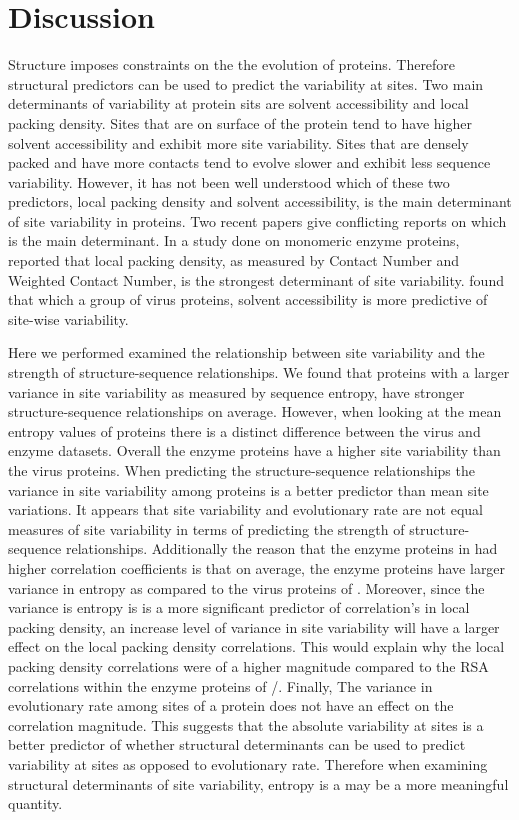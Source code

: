 \documentclass[12pt]{article}
\begin{document}
\section{Discussion}
\label{sec:dcr}
Structure imposes constraints on the the evolution of proteins. Therefore structural predictors can be used to predict the variability at sites. Two main determinants of variability at protein sits are solvent accessibility and local packing density. Sites that are on surface of the protein tend to have higher solvent accessibility and exhibit more site variability. Sites that are densely packed and have more contacts tend to evolve slower and exhibit less sequence variability. However, it has not been well understood which of these two predictors, local packing density and solvent accessibility, is the main determinant of site variability in proteins. Two recent papers \citep{Shahmoradietal2014, Yehetal2014} give conflicting reports on which is the main determinant. In a study done on monomeric enzyme proteins, \cite{Yehetal2014} reported that local packing density, as measured by Contact Number and Weighted Contact Number, is the strongest determinant of site variability. \cite{Shahmoradietal2014} found that which a group of virus proteins, solvent accessibility is more predictive of site-wise variability. 

\indent Here we performed examined the relationship between site variability and the strength of structure-sequence relationships. We found that proteins with a larger variance in site variability as measured by sequence entropy, have stronger structure-sequence relationships on average. However, when looking at the mean entropy values of proteins there is a distinct difference between the virus and enzyme datasets. Overall the enzyme proteins have a higher site variability than the virus proteins. When predicting the structure-sequence relationships the variance in site variability among proteins is a better predictor than mean site variations. It appears that site variability and evolutionary rate are not equal measures of site variability in terms of predicting the strength of structure-sequence relationships. Additionally the reason that the enzyme proteins in \cite{Yehetal2014} had higher correlation coefficients is that on average, the enzyme proteins have larger variance in entropy as compared to the virus proteins of \cite{Shahmoradietal2014}. Moreover, since the variance is entropy is is a more significant predictor of correlation's in local packing density, an increase level of variance in site variability will have a larger effect on the local packing density correlations. This would explain why the local packing density correlations were of a higher magnitude compared to the RSA correlations within the enzyme proteins of /\cite{Yehetal2014}. Finally, The variance in evolutionary rate among sites of a protein does not have an effect on the correlation magnitude. This suggests that the absolute variability at sites is a better predictor of whether structural determinants can be used to predict variability at sites  as opposed to evolutionary rate. Therefore when examining structural determinants of site variability, entropy is a may be a more meaningful quantity. 
\end{document}
